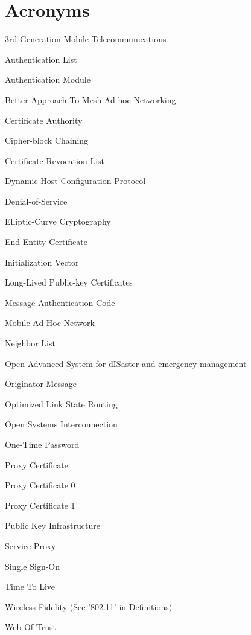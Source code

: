 \chapter*{Acronyms}

\begin{acronym}

 {3rd Generation Mobile Telecommunications}


 {Authentication List}

 {Authentication Module}

 {Better Approach To Mesh Ad hoc Networking}

 {Certificate Authority}

 {Cipher-block Chaining}

 {Certificate Revocation List}

 {Dynamic Host Configuration Protocol}


 {Denial-of-Service}

 {Elliptic-Curve Cryptography}

 {End-Entity Certificate}

 {Initialization Vector}

 {Long-Lived Public-key Certificates}

 {Message Authentication Code}

 {Mobile Ad Hoc Network}


 {Neighbor List}

 {Open Advanced System for dISaster and emergency management}

 {Originator Message}

 {Optimized Link State Routing}

 {Open Systems Interconnection}

 {One-Time Password}

 {Proxy Certificate}

 {Proxy Certificate 0}

 {Proxy Certificate 1}


 {Public Key Infrastructure}



 {Service Proxy}

 {Single Sign-On}

 {Time To Live}


 {Wireless Fidelity (See '802.11' in Definitions)}

 {Web Of Trust}

\end{acronym}
